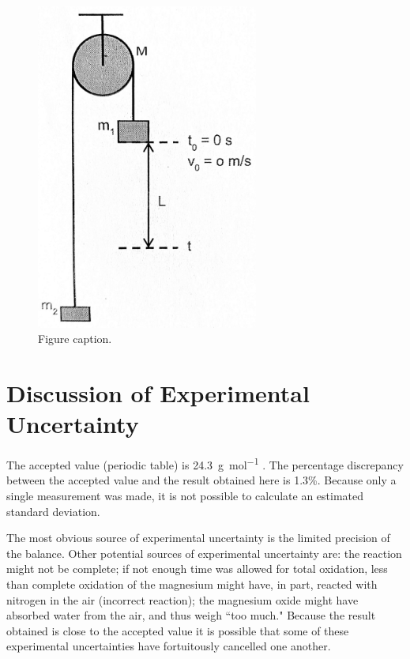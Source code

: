 \documentclass{article}
\begin{document}
\begin{figure}[h]
    \begin{center}
        \includegraphics[width=0.65\textwidth]{okay.jpg}
        \caption{Figure caption.}
    \end{center}
\end{figure}


\section{Discussion of Experimental Uncertainty}

The accepted value (periodic table) is \SI{24.3}{\gram\per\mole} \cite{Smith:2012qr}. The percentage discrepancy between the accepted value and the result obtained here is 1.3\%. Because only a single measurement was made, it is not possible to calculate an estimated standard deviation.

The most obvious source of experimental uncertainty is the limited precision of the balance. Other potential sources of experimental uncertainty are: the reaction might not be complete; if not enough time was allowed for total oxidation, less than complete oxidation of the magnesium might have, in part, reacted with nitrogen in the air (incorrect reaction); the magnesium oxide might have absorbed water from the air, and thus weigh ``too much." Because the result obtained is close to the accepted value it is possible that some of these experimental uncertainties have fortuitously cancelled one another.
\end{document}

